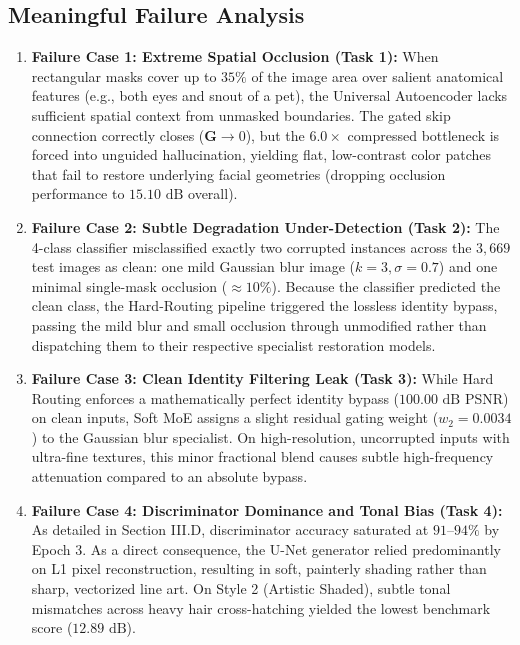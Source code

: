 \documentclass[conference]{IEEEtran}
\begin{document}
\subsection{Meaningful Failure Analysis}
\begin{enumerate}
    \item \textbf{Failure Case 1: Extreme Spatial Occlusion (Task 1):} When rectangular masks cover up to $35\%$ of the image area over salient anatomical features (e.g., both eyes and snout of a pet), the Universal Autoencoder lacks sufficient spatial context from unmasked boundaries. The gated skip connection correctly closes ($\mathbf{G} \to 0$), but the $6.0\times$ compressed bottleneck is forced into unguided hallucination, yielding flat, low-contrast color patches that fail to restore underlying facial geometries (dropping occlusion performance to $15.10\text{ dB}$ overall).
    \item \textbf{Failure Case 2: Subtle Degradation Under-Detection (Task 2):} The 4-class classifier misclassified exactly two corrupted instances across the $3,669$ test images as clean: one mild Gaussian blur image ($k=3, \sigma=0.7$) and one minimal single-mask occlusion ($\approx 10\%$). Because the classifier predicted the clean class, the Hard-Routing pipeline triggered the lossless identity bypass, passing the mild blur and small occlusion through unmodified rather than dispatching them to their respective specialist restoration models.
    \item \textbf{Failure Case 3: Clean Identity Filtering Leak (Task 3):} While Hard Routing enforces a mathematically perfect identity bypass ($100.00\text{ dB}$ PSNR) on clean inputs, Soft MoE assigns a slight residual gating weight ($w_2 = 0.0034$) to the Gaussian blur specialist. On high-resolution, uncorrupted inputs with ultra-fine textures, this minor fractional blend causes subtle high-frequency attenuation compared to an absolute bypass.
    \item \textbf{Failure Case 4: Discriminator Dominance and Tonal Bias (Task 4):} As detailed in Section III.D, discriminator accuracy saturated at $91$--$94\%$ by Epoch 3. As a direct consequence, the U-Net generator relied predominantly on L1 pixel reconstruction, resulting in soft, painterly shading rather than sharp, vectorized line art. On Style 2 (Artistic Shaded), subtle tonal mismatches across heavy hair cross-hatching yielded the lowest benchmark score ($12.89\text{ dB}$).
\end{enumerate}
\end{document}
